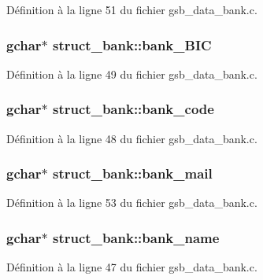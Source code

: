 Définition à la ligne 51 du fichier gsb\_\-data\_\-bank.c.

\subsubsection[{bank\_\-BIC}]{\setlength{\rightskip}{0pt plus 5cm}gchar$\ast$ {\bf struct\_\-bank::bank\_\-BIC}}\label{structstruct__bank_a4a9aba5e61739939484bb663937ec247}


Définition à la ligne 49 du fichier gsb\_\-data\_\-bank.c.

\subsubsection[{bank\_\-code}]{\setlength{\rightskip}{0pt plus 5cm}gchar$\ast$ {\bf struct\_\-bank::bank\_\-code}}\label{structstruct__bank_a67bf231d7fe307de15f9ac55d27a9bda}


Définition à la ligne 48 du fichier gsb\_\-data\_\-bank.c.

\subsubsection[{bank\_\-mail}]{\setlength{\rightskip}{0pt plus 5cm}gchar$\ast$ {\bf struct\_\-bank::bank\_\-mail}}\label{structstruct__bank_a59e427cc01ec8ec76c87116acf85b26c}


Définition à la ligne 53 du fichier gsb\_\-data\_\-bank.c.

\subsubsection[{bank\_\-name}]{\setlength{\rightskip}{0pt plus 5cm}gchar$\ast$ {\bf struct\_\-bank::bank\_\-name}}\label{structstruct__bank_aa68cd51e28b8e5daeabb7f416dc631e8}


Définition à la ligne 47 du fichier gsb\_\-data\_\-bank.c.


